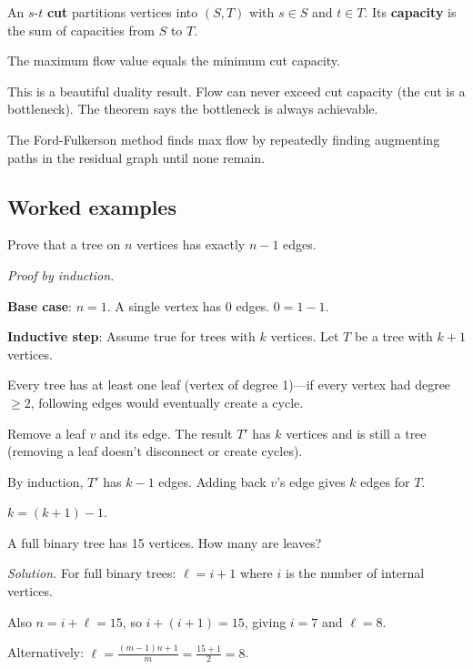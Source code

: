 \begin{definition}[Cut]
An $s$-$t$ \textbf{cut} partitions vertices into $(S, T)$ with $s \in S$ and $t \in T$. Its \textbf{capacity} is the sum of capacities from $S$ to $T$.
\end{definition}

\begin{theorem}
The maximum flow value equals the minimum cut capacity.
\end{theorem}

This is a beautiful duality result. Flow can never exceed cut capacity (the cut is a bottleneck). The theorem says the bottleneck is always achievable.

\begin{remark}
The Ford-Fulkerson method finds max flow by repeatedly finding augmenting paths in the residual graph until none remain.
\end{remark}

\subsection*{Worked examples}

\begin{example}
Prove that a tree on $n$ vertices has exactly $n - 1$ edges.

\emph{Proof by induction.}

\textbf{Base case}: $n = 1$. A single vertex has 0 edges. $0 = 1 - 1$. \checkmark

\textbf{Inductive step}: Assume true for trees with $k$ vertices. Let $T$ be a tree with $k + 1$ vertices.

Every tree has at least one leaf (vertex of degree 1)---if every vertex had degree $\geq 2$, following edges would eventually create a cycle.

Remove a leaf $v$ and its edge. The result $T'$ has $k$ vertices and is still a tree (removing a leaf doesn't disconnect or create cycles).

By induction, $T'$ has $k - 1$ edges. Adding back $v$'s edge gives $k$ edges for $T$.

$k = (k + 1) - 1$. \checkmark
\end{example}

\begin{example}
A full binary tree has 15 vertices. How many are leaves?

\emph{Solution.} For full binary trees: $\ell = i + 1$ where $i$ is the number of internal vertices.

Also $n = i + \ell = 15$, so $i + (i+1) = 15$, giving $i = 7$ and $\ell = 8$.

Alternatively: $\ell = \frac{(m-1)n + 1}{m} = \frac{15 + 1}{2} = 8$.
\end{example}

